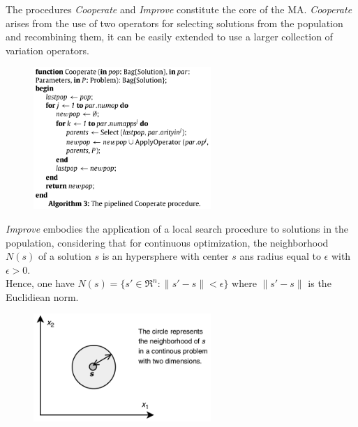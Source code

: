 \documentclass[]{beamer}
\begin{document}
{{ } 
 {
The procedures \emph{Cooperate} and \emph{Improve} constitute the core of
the MA. \emph{Cooperate} arises from the use of two operators for selecting solutions from the
population and recombining them, it can
be easily extended to use a larger collection of variation operators.\\
\vspace{0.15cm}
    \begin{figure}
    \centering
    \includegraphics[width = 0.6\textwidth]{alg3.png}
    \caption{}
  	\end{figure}

 }
 
 {
 \emph{Improve} embodies the application of
a local search procedure to solutions in the population, considering that for continuous optimization, the neighborhood $N(s)$ of a solution $s$ is an hypersphere with center $s$ ans radius equal to $\epsilon$ with $\epsilon>0$.\\
\vspace{0.15cm}
Hence, one have $N(s)=\{s' \in \Re^n : \parallel s'-s\parallel <\epsilon\}$ where $\parallel s'-s\parallel$ is the Euclidiean norm.\\
  
    \begin{figure}
    \centering
    \includegraphics[width = 0.6\textwidth]{ls.png}
    \caption{}
  	\end{figure}

}}
\end{document}
